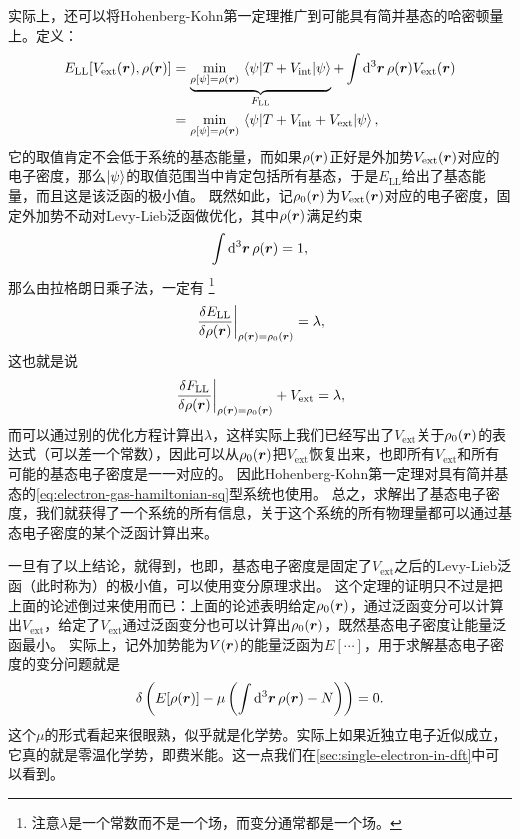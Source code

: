 实际上，还可以将Hohenberg-Kohn第一定理推广到可能具有简并基态的哈密顿量上。定义：
\begin{equation}
    \begin{aligned}
        E_\text{LL} [V_\text{ext}(\vb*{r}), \rho(\vb*{r})]  &= \underbrace{\min_{\rho[\psi]=\rho(\vb*{r})} \mel{\psi}{{T} + {V}_\text{int}}{\psi}}_{F_\text{LL}} + \int \dd[3]{\vb*{r}} \rho(\vb*{r}) V_\text{ext} (\vb*{r}) \\
        &= \min_{\rho[\psi]=\rho(\vb*{r})} \mel{\psi}{{T} + {V_\text{int}} + {V}_\text{ext}}{\psi},
    \end{aligned}
    \label{eq:levy-lieb}
\end{equation}
它的取值肯定不会低于系统的基态能量，而如果$\rho(\vb*{r})$正好是外加势$V_\text{ext}(\vb*{r})$对应的电子密度，那么$\ket{\psi}$的取值范围当中肯定包括所有基态，于是$E_\text{LL}$给出了基态能量，而且这是该泛函的极小值。
既然如此，记$\rho_0(\vb*{r})$为$V_\text{ext}(\vb*{r})$对应的电子密度，固定外加势不动对Levy-Lieb泛函做优化，其中$\rho(\vb*{r})$满足约束
\[
    \int \dd[3]{\vb*{r}} \rho(\vb*{r}) = 1,
\]
那么由拉格朗日乘子法，一定有%
\footnote{注意$\lambda$是一个常数而不是一个场，而变分通常都是一个场。}%
\[
    \eval{\fdv{E_\text{LL}}{\rho(\vb*{r})}}_{\rho(\vb*{r}) = \rho_0 (\vb*{r})} = \lambda,
\]
这也就是说
\[
    \eval{\fdv{F_\text{LL}}{\rho(\vb*{r})}}_{\rho(\vb*{r}) = \rho_0(\vb*{r})} + V_\text{ext} = \lambda,
\]
而可以通过别的优化方程计算出$\lambda$，这样实际上我们已经写出了$V_\text{ext}$关于$\rho_0(\vb*{r})$的表达式（可以差一个常数），因此可以从$\rho_0(\vb*{r})$把$V_\text{ext}$恢复出来，也即所有$V_\text{ext}$和所有可能的基态电子密度是一一对应的。
因此Hohenberg-Kohn第一定理对具有简并基态的\eqref{eq:electron-gas-hamiltonian-sq}型系统也使用。
总之，求解出了基态电子密度，我们就获得了一个系统的所有信息，关于这个系统的所有物理量都可以通过基态电子密度的某个泛函计算出来。

一旦有了以上结论，就得到，也即，基态电子密度是固定了$V_\text{ext}$之后的Levy-Lieb泛函（此时称为）的极小值，可以使用变分原理求出。
这个定理的证明只不过是把上面的论述倒过来使用而已：上面的论述表明给定$\rho_0(\vb*{r})$，通过泛函变分可以计算出$V_\text{ext}$，给定了$V_\text{ext}$通过泛函变分也可以计算出$\rho_0(\vb*{r})$，既然基态电子密度让能量泛函最小。
实际上，记外加势能为$V(\vb*{r})$的能量泛函为$E[\cdots]$，用于求解基态电子密度的变分问题就是
\begin{equation}
    \var \left( E[\rho(\vb*{r})] - \mu \left( \int \dd[3]{\vb*{r}} \rho(\vb*{r}) - N \right) \right) = 0.
    \label{eq:dft-variation-principle}
\end{equation}
这个$\mu$的形式看起来很眼熟，似乎就是化学势。实际上如果近独立电子近似成立，它真的就是零温化学势，即费米能。这一点我们在\autoref{sec:single-electron-in-dft}中可以看到。

